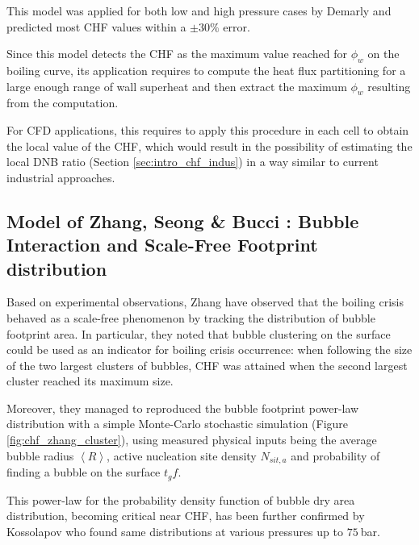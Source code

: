 This model was applied for both low and high pressure cases by Demarly \cite{demarly_new_2020} and predicted most CHF values within a $\pm 30\%$ error.

\begin{remark*}{}
Since this model detects the CHF as the maximum value reached for $\phi_{w}$ on the boiling curve, its application requires to compute the heat flux partitioning for a large enough range of wall superheat and then extract the maximum $\phi_{w}$ resulting from the computation. 

\npar

For CFD applications, this requires to apply this procedure in each cell to obtain the local value of the CHF, which would result in the possibility of estimating the local DNB ratio (Section \ref{sec:intro_chf_indus}) in a way similar to current industrial approaches.
\end{remark*}



\subsection{Model of Zhang, Seong \& Bucci \cite{zhang_percolative_2019}:  Bubble Interaction and Scale-Free Footprint distribution}



Based on experimental observations, Zhang \etal \cite{zhang_percolative_2019} have observed that the boiling crisis behaved as a scale-free phenomenon by tracking the distribution of bubble footprint area. In particular, they noted that bubble clustering on the surface could be used as an indicator for boiling crisis occurrence: when following the size of the two largest clusters of bubbles, CHF was attained when the second largest cluster reached its maximum size.

\npar

Moreover, they managed to reproduced the bubble footprint power-law distribution with a simple Monte-Carlo stochastic simulation (Figure \ref{fig:chf_zhang_cluster}), using measured physical inputs being the average bubble radius $\left<R\right>$, active nucleation site density $N_{sit,a}$ and probability of finding a bubble on the surface $t_{g}f$.

\begin{remark*}{}
This power-law for the probability density function of bubble dry area distribution, becoming critical near CHF, has been further confirmed by Kossolapov \cite{kossolapov_experimental_2021} who found same distributions at various pressures up to $75\ $bar.
\end{remark*}

